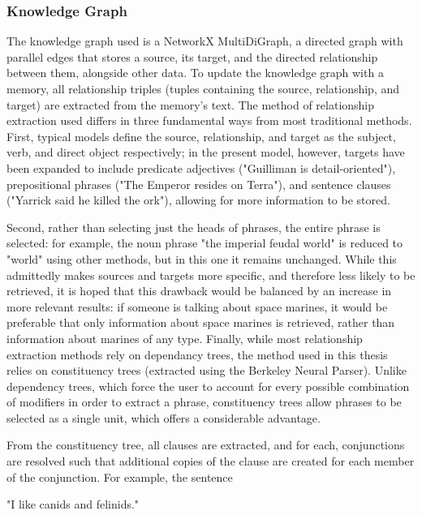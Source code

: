 \subsubsection{Knowledge Graph}

The knowledge graph used is a NetworkX MultiDiGraph, a directed graph with parallel edges that stores a source, its target, and the directed relationship between them, alongside other data. To update the knowledge graph with a memory, all relationship triples (tuples containing the source, relationship, and target) are extracted from the memory's text. The method of relationship extraction used differs in three fundamental ways from most traditional methods. First, typical models define the source, relationship, and target as the subject, verb, and direct object respectively; in the present model, however, targets have been expanded to include predicate adjectives ("Guilliman is detail-oriented"), prepositional phrases ("The Emperor resides on Terra"), and sentence clauses ("Yarrick said he killed the ork"), allowing for more information to be stored. 

Second, rather than selecting just the heads of phrases, the entire phrase is selected: for example, the noun phrase "the imperial feudal world" is reduced to "world" using other methods, but in this one it remains unchanged. While this admittedly makes sources and targets more specific, and therefore less likely to be retrieved, it is hoped that this drawback would be balanced by an increase in more relevant results: if someone is talking about space marines, it would be preferable that only information about space marines is retrieved, rather than information about marines of any type. Finally, while most relationship extraction methods rely on dependancy trees, the method used in this thesis relies on constituency trees (extracted using the Berkeley Neural Parser). Unlike dependency trees, which force the user to account for every possible combination of modifiers in order to extract a phrase, constituency trees allow phrases to be selected as a single unit, which offers a considerable advantage.

From the constituency tree, all clauses are extracted, and for each, conjunctions are resolved such that additional copies of the clause are created for each member of the conjunction. For example, the sentence

\begin{displayquote}
"I like canids and felinids."
\end{displayquote}

